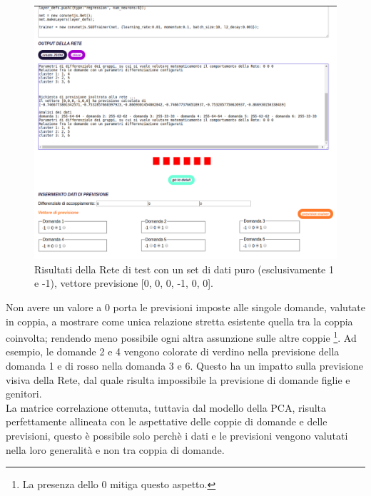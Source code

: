 \begin{figure}[H]
\centering
	\includegraphics[width=1\linewidth]{./image/RetediProva_generatorinputpuro3.png}
	\caption{Risultati della Rete di test con un set di dati puro (esclusivamente 1 e -1), vettore previsione [0, 0, 0, -1, 0, 0].}
	\label{Risultati della Rete di test con un set di dati puro (esclusivamente 1 e -1), vettore previsione [0, 0, 0, -1, 0, 0].}
\end{figure}
\noindent
Non avere un valore a 0 porta le previsioni imposte alle singole domande, valutate in coppia, a mostrare come unica relazione stretta esistente quella tra la coppia coinvolta; rendendo meno possibile ogni altra assunzione sulle altre coppie \footnote{La presenza dello 0 mitiga questo aspetto.}. Ad esempio, le domande 2 e 4 vengono colorate di verdino nella previsione della domanda 1 e di rosso nella domanda 3 e 6. Questo ha un impatto sulla previsione visiva della Rete, dal quale risulta impossibile la previsione di domande figlie e genitori.\\
La matrice correlazione ottenuta, tuttavia dal modello della PCA, risulta perfettamente allineata con le aspettative delle coppie di domande e delle previsioni, questo \`e possibile solo perch\`e i dati e le previsioni vengono valutati nella loro generalit\`a e non tra coppia di domande.


